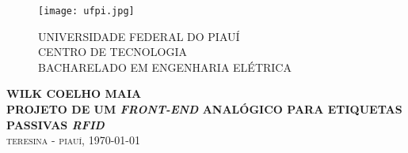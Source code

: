 \pagestyle{empty}


\begin{center}
\begin{figure}[h!]
\parbox{2.5cm}{\texttt{[image: ufpi.jpg]}}%
\quad
\begin{minipage}{12cm}%
\vspace{1cm}
\textsc{\large UNIVERSIDADE FEDERAL DO PIAUÍ}\\
\textsc{\large CENTRO DE TECNOLOGIA}\\
\textsc{\large BACHARELADO EM ENGENHARIA ELÉTRICA}\\
\end{minipage} %
\end{figure}
\vspace{4cm}
\textbf{\large WILK COELHO MAIA}\\
\vspace{4cm}
\textbf{\large PROJETO DE UM \textit{FRONT-END} ANALÓGICO PARA ETIQUETAS PASSIVAS \textit{RFID}}\\
\vfill
\textsc{\large teresina - piauí, \today}\\
\end{center}
\clearpage



